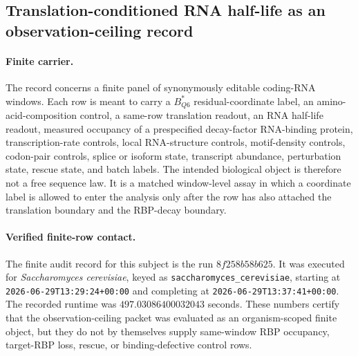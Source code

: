 
\subsection{Translation-conditioned RNA half-life as an observation-ceiling record}
\label{sec:bioreality-q6-rna-half-life-rbp-observation-ceiling}

\paragraph{Finite carrier.}
The record concerns a finite panel of synonymously editable coding-RNA windows.  Each row is meant to carry a $B^*_{Q6}$ residual-coordinate label, an amino-acid-composition control, a same-row translation readout, an RNA half-life readout, measured occupancy of a prespecified decay-factor RNA-binding protein, transcription-rate controls, local RNA-structure controls, motif-density controls, codon-pair controls, splice or isoform state, transcript abundance, perturbation state, rescue state, and batch labels.  The intended biological object is therefore not a free sequence law.  It is a matched window-level assay in which a coordinate label is allowed to enter the analysis only after the row has also attached the translation boundary and the RBP-decay boundary.

\paragraph{Verified finite-row contact.}
The finite audit record for this subject is the run $8f258b58b625$.  It was executed for \emph{Saccharomyces cerevisiae}, keyed as \texttt{saccharomyces\_cerevisiae}, starting at \texttt{2026-06-29T13:29:24+00:00} and completing at \texttt{2026-06-29T13:37:41+00:00}.  The recorded runtime was $497.03086400032043$ seconds.  These numbers certify that the observation-ceiling packet was evaluated as an organism-scoped finite object, but they do not by themselves supply same-window RBP occupancy, target-RBP loss, rescue, or binding-defective control rows.

